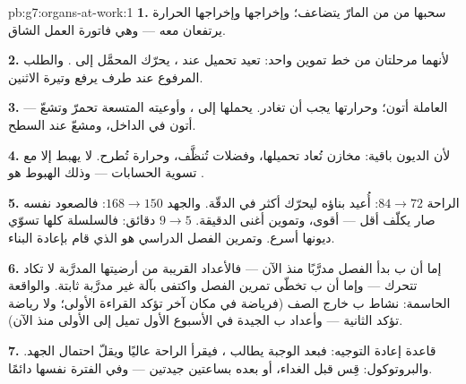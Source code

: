 \begin{solution}{pb:g7:organs-at-work:1}
\textbf{1.} سحبها من   من  المارّ يتضاعف؛
وإخراجها  وإخراجها الحرارة يرتفعان معه ---
وهي فاتورة العمل الشاق.

\textbf{2.} لأنهما مرحلتان من خط تموين واحد: 
تعيد تحميل  عند ،  يحرّك  المحمَّل إلى
. والطلب المرفوع عند طرف يرفع وتيرة الاثنين.

\textbf{3.}  العاملة أتون؛ وحرارتها يجب أن تغادر. 
يحملها إلى ، وأوعيته المتسعة تحمرّ وتشعّ --- أتون في الداخل،
ومشعّ عند السطح.

\textbf{4.} لأن الديون باقية: مخازن  تُعاد تحميلها، وفضلات
تُنظَّف، وحرارة تُطرح.  لا يهبط إلا مع تسوية الحسابات ---
وذلك الهبوط هو .

\textbf{5.} الراحة $84 \to 72$:  أُعيد بناؤه ليحرّك أكثر في
الدقّة. والجهد $168 \to 150$: فالصعود نفسه صار يكلّف أقل ---
 أقوى، وتموين أغنى  الدقيقة.  $9 \to 5$
دقائق: فالسلسلة كلها تسوّي ديونها أسرع. وتمرين الفصل الدراسي هو
الذي قام بإعادة البناء.

\textbf{6.} إما أن ب بدأ الفصل مدرَّبًا منذ الآن --- فالأعداد
القريبة من أرضيتها المدرَّبة لا تكاد تتحرك --- وإما أن ب تخطّى
تمرين الفصل واكتفى بآلة غير مدرَّبة ثابتة. والواقعة الحاسمة: نشاط
ب خارج الصف (فرياضة في مكان آخر تؤكد القراءة الأولى؛ ولا رياضة
تؤكد الثانية --- وأعداد ب الجيدة في الأسبوع الأول تميل إلى الأولى
منذ الآن).

\textbf{7.} قاعدة إعادة التوجيه: فبعد الوجبة يطالب 
، فيقرأ  الراحة عاليًا ويقلّ احتمال الجهد. والبروتوكول:
قِس قبل الغداء، أو بعده بساعتين جيدتين --- وفي الفترة نفسها
دائمًا.


\end{solution}
